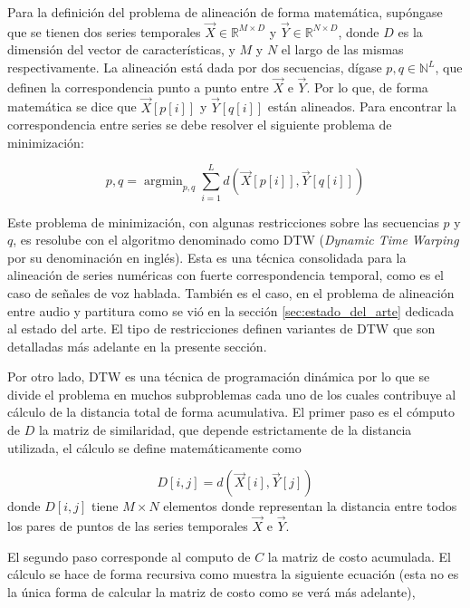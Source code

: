 \documentclass
  [ams,pdfout]%
	{aeslac}
\DeclareMathOperator*{\argmin}{argmin}
\begin{document}
Para la definición del problema de alineación de forma matemática, supóngase que se tienen dos series temporales $\vec{X}\in\mathbb{R}^{M\times D}$ y $\vec{Y}\in\mathbb{R}^{N\times D}$, donde $D$ es la dimensión del vector de características, y $M$ y $N$ el largo de las mismas respectivamente. La alineación está dada por dos secuencias, dígase $p, q \in \mathbb{N}^{L}$, que definen la correspondencia punto a punto entre $\vec{X}$ e $\vec{Y}$. Por lo que, de forma matemática se dice que $\vec{X}[p[i]]$ y $\vec{Y}[q[i]]$ están alineados. Para encontrar la correspondencia entre series se debe resolver el siguiente problema de minimización:

\begin{equation}
p,q = \argmin_{p,q} \sum_{i=1}^{L} d(\vec{X}[p[i]],\vec{Y}[q[i]]) 
\end{equation}

Este problema de minimización, con algunas restricciones sobre las secuencias $p$ y $q$, es resolube con el algoritmo denominado como DTW (\textit{Dynamic Time Warping} por su denominación en inglés). Esta es una técnica consolidada para la alineación de series numéricas con fuerte correspondencia temporal, como es el caso de señales de voz hablada\cite{rabiner1978considerations,sakoe1978dynamic}. También es el caso, en el problema de alineación entre audio y partitura como se vió en la sección \ref{sec:estado_del_arte} dedicada al estado del arte. El tipo de restricciones definen variantes de DTW que son detalladas más adelante en la presente sección.

Por otro lado, DTW es una técnica de programación dinámica por lo que se divide el problema en muchos subproblemas cada uno de los cuales contribuye al cálculo de la distancia total de forma acumulativa. El primer paso es el cómputo de $D$ la matriz de similaridad, que depende estrictamente de la distancia utilizada, el cálculo se define matemáticamente como


\begin{equation}
\label{eq:matrizsimilaridad}
D[i,j] = d(\vec{X}[i],\vec{Y}[j])
\end{equation}
donde $D[i,j]$ tiene $M\times N$ elementos donde representan la distancia entre todos los pares de puntos de las series temporales $\vec{X}$ e $\vec{Y}$.  


El segundo paso corresponde al computo de $C$ la matriz de costo acumulada. El cálculo se hace de forma recursiva como muestra la siguiente ecuación (esta no es la única forma de calcular la matriz de costo como se verá más adelante), 
\end{document}

